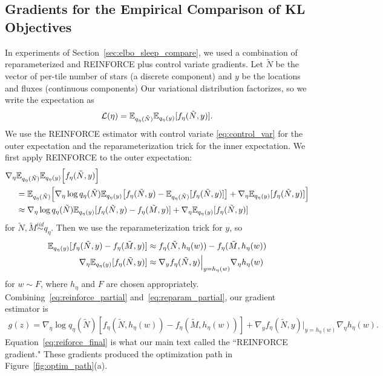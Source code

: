 \subsection{Gradients for the Empirical Comparison of KL Objectives}
In experiments of Section~\ref{sec:elbo_sleep_compare}, 
we used a combination of reparameterized and REINFORCE plus control variate gradients.
Let $\tilde N$ be the vector of per-tile number of stars (a discrete component) and $y$ be the locations and fluxes (continuous components)
Our variational distribution factorizes, so we write the expectation as
\begin{align}
 \mathcal{L}(\eta) = \mathbb{E}_{q_\eta(\tilde N)}\mathbb{E}_{q_\eta(y)}[f_\eta(\tilde N, y)].
 \label{eq:elbo_factorized}
\end{align}
We use the REINFORCE estimator with control variate \eqref{eq:control_var} for the outer expectation and the reparameterization trick for the inner expectation. 
We first apply REINFORCE to the outer expectation:
\begin{align}
    \nabla_\eta  &
    \mathbb{E}_{q_\eta(\tilde N)}\mathbb{E}_{q_\eta(y)}\Big[f_\eta(\tilde N, y)\Big] \\
    &=  \mathbb{E}_{q_\eta(\tilde N)}\Big[ \nabla_\eta \log q_\eta(\tilde N) \mathbb{E}_{q_\eta(y)}\big[f_\eta(\tilde N, y) - 
    \mathbb{E}_{q_\eta(\tilde N)}[f_\eta(\tilde N, y)]\big] +
    \nabla_\eta \mathbb{E}_{q_\eta(y)}[f_\eta(\tilde N, y)] \Big]\\
    &\approx \nabla_\eta \log q_\eta(\tilde N) \mathbb{E}_{q_\eta(y)}[f_\eta(\tilde N, y) - f_\eta(\tilde M, y)] +
    \nabla_\eta \mathbb{E}_{q_\eta(y)}[f_\eta(\tilde N, y)]
    \label{eq:reinforce_partial}
\end{align}
 for $\tilde N,\tilde M \overset{iid}\sim q_\eta$.
Then we use the reparameterization trick for $y$, so
\begin{align}
    \mathbb{E}_{q_\eta(y)}[f_\eta(\tilde N, y) - f_\eta( \tilde M, y)] &\approx f_\eta(\tilde N, h_\eta(w)) - f_\eta(\tilde M, h_\eta(w))\\
    \nabla_\eta \mathbb{E}_{q_\eta(y)}[f_\eta(\tilde N, y)] &\approx  \nabla_y f_\eta(\tilde N, y)\Big|_{y = h_\eta(w)}
    \nabla_\eta h_\eta(w)
    \label{eq:reparam_partial}
\end{align}
for $w \sim F$, where $h_\eta$ and $F$ are chosen appropriately. Combining~\eqref{eq:reinforce_partial} and~\eqref{eq:reparam_partial}, our gradient estimator is
\begin{align}
    g(z) = \nabla_\eta \log q_\eta(\tilde N)
    [f_\eta(\tilde N, h_\eta(w)) - f_\eta(\tilde M, h_\eta(w))] +
    \nabla_y f_\eta(\tilde N, y)\Big|_{y = h_\eta(w)}
    \nabla_\eta h_\eta(w).
    \label{eq:reiforce_final}
\end{align}
Equation~\eqref{eq:reiforce_final} is what our main text called the ``REINFORCE gradient."
These gradients produced the optimization path in Figure~\ref{fig:optim_path}(a).


